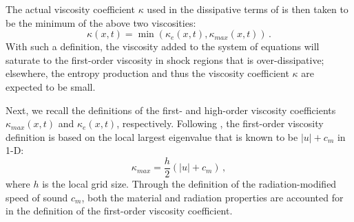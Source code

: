 \documentclass[review]{elsarticle}
\begin{document}
The actual viscosity coefficient $\kappa$ used in the dissipative terms of  is then taken to be the minimum of the above two viscosities:  
%
\begin{equation}
\kappa(x,t) = \min ( \kappa_e(x,t), \kappa_{max}(x,t) ) \, . 
\end{equation}
%
With such a definition, the viscosity added to the system of equations will saturate to the first-order viscosity in shock regions that is over-dissipative; elsewhere, the entropy production and thus the viscosity coefficient $\kappa$ are expected to be small.

Next, we recall the definitions of the first- and high-order viscosity coefficients $\kappa_{max}(x,t)$ and $\kappa_e(x,t)$, respectively. Following \cite{our_jcp_radhy_paper}, the first-order viscosity definition is based on the local largest eigenvalue that is known to be $|u| + c_m$ in 1-D:
%
\begin{equation}
\label{eq:equation8}
\kappa_{max} = \frac{h}{2} \left( |u| + c_m \right) \,,
\end{equation}  
%
where $h$ is the local grid size. Through the definition of the radiation-modified speed of sound $c_m$, both the material and radiation properties are accounted for in the definition of the first-order viscosity coefficient. 
\end{document}
